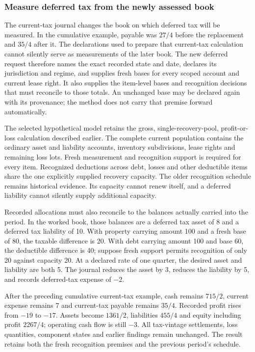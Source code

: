 

\subsubsection*{Measure deferred tax from the newly assessed book}
The current-tax journal changes the book on which deferred tax will be measured.
In the cumulative example, payable was $27/4$ before the replacement and $35/4$
after it. The declarations used to prepare that current-tax calculation cannot
silently serve as measurements of the later book. The new deferred request
therefore names the exact recorded state and date, declares its jurisdiction and
regime, and supplies fresh bases for every scoped account and current lease
right. It also supplies the item-level bases and recognition decisions that
must reconcile to those totals. An unchanged base may be declared again with
its provenance; the method does not carry that premise forward automatically.

The selected hypothetical model retains the gross, single-recovery-pool,
profit-or-loss calculation described earlier. The complete current population
contains the ordinary asset and liability accounts, inventory subdivisions,
lease rights and remaining loss lots. Fresh measurement and recognition support
is required for every item. Recognized deductions across debt, losses and other
deductible items share the one explicitly supplied recovery capacity. The older
recognition schedule remains historical evidence. Its capacity cannot renew
itself, and a deferred liability cannot silently supply additional capacity.

Recorded allocations must also reconcile to the balances actually carried into
the period. In the worked book, those balances are a deferred tax asset of 8
and a deferred tax liability of 10. With property carrying amount 100 and a
fresh base of 80, the taxable difference is 20. With debt carrying amount 100
and base 60, the deductible difference is 40; suppose fresh support permits
recognition of only 20 against capacity 20. At a declared rate of one quarter,
the desired asset and liability are both 5. The journal reduces the asset by 3,
reduces the liability by 5, and records deferred-tax expense of $-2$.

After the preceding cumulative current-tax example, cash remains $715/2$,
current expense remains 7 and current-tax payable remains $35/4$. Recorded
profit rises from $-19$ to $-17$. Assets become $1361/2$, liabilities $455/4$
and equity including profit $2267/4$; operating cash flow is still $-3$.
All tax-vintage settlements, loss quantities, component states and earlier
findings remain unchanged. The result retains both the fresh recognition
premises and the previous period's schedule.

